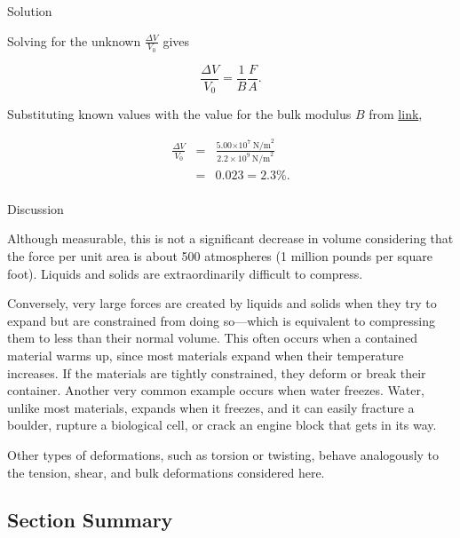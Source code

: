 \documentclass[
]{book}
\newenvironment{tinysection}{}{}
\begin{document}
\begin{tinysection}

{Solution}

\end{tinysection}

Solving for the unknown \(\frac{\Delta V}{V_{0}}\) gives

\leavevmode\hypertarget{eip-646}{}%
\[{{{\frac{\Delta V}{V_{0}} = \frac{1}{B}}\frac{F}{A}}.}{}\]

Substituting known values with the value for the bulk modulus \(B\) from
\protect\hyperlink{import-auto-id1165298671576}{link},

\leavevmode\hypertarget{eip-818}{}%
\[\begin{array}{lll}
\frac{\Delta V}{V_{0}} & = & \frac{5.00{\times \text{10}^{7}}\ \text{N/m}^{2}}{2\text{.}{2 \times \text{10}^{9}}\ \text{N/m}^{2}} \\
 & = & {0.023 = 2.3\%.} \\
\end{array}{}\]

\begin{tinysection}

{Discussion}

\end{tinysection}

Although measurable, this is not a significant decrease in volume
considering that the force per unit area is about 500 atmospheres (1
million pounds per square foot). Liquids and solids are extraordinarily
difficult to compress.

Conversely, very large forces are created by liquids and solids when
they try to expand but are constrained from doing so---which is
equivalent to compressing them to less than their normal volume. This
often occurs when a contained material warms up, since most materials
expand when their temperature increases. If the materials are tightly
constrained, they deform or break their container. Another very common
example occurs when water freezes. Water, unlike most materials, expands
when it freezes, and it can easily fracture a boulder, rupture a
biological cell, or crack an engine block that gets in its way.

Other types of deformations, such as torsion or twisting, behave
analogously to the tension, shear, and bulk deformations considered
here.

\hypertarget{fs-id1165298595602-summary}{}
\hypertarget{section-summary-16}{%
\subsection{Section Summary}\label{section-summary-16}}
\end{document}
